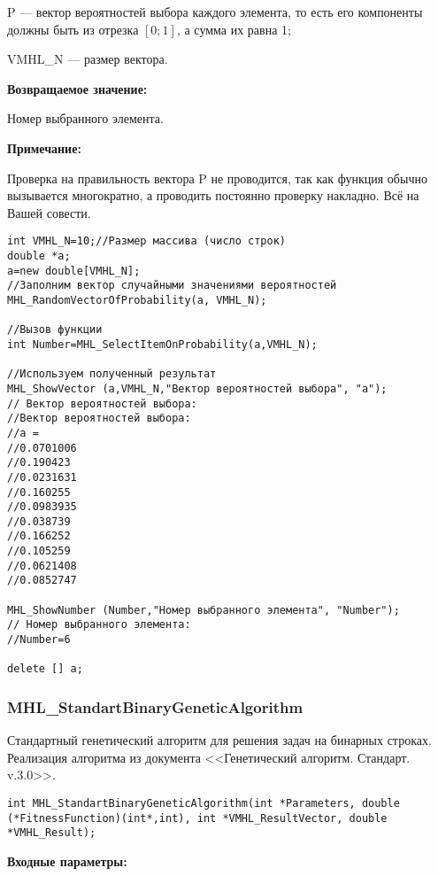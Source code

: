 \documentclass[a4paper,12pt]{article}
\begin{document}
 P --- вектор вероятностей выбора каждого элемента, то есть его компоненты должны быть из отрезка $[0;1]$, а сумма их равна 1;
 
 VMHL\_N --- размер вектора.

\textbf{Возвращаемое значение:} 

Номер выбранного элемента.

\textbf{Примечание:}

 Проверка на правильность вектора P не проводится, так как функция обычно вызывается многократно, а проводить постоянно проверку накладно. Всё на Вашей совести.



\begin{lstlisting}[label=code_use_MHL_SelectItemOnProbability,caption=Пример использования]
int VMHL_N=10;//Размер массива (число строк)
double *a;
a=new double[VMHL_N];
//Заполним вектор случайными значениями вероятностей
MHL_RandomVectorOfProbability(a, VMHL_N);

//Вызов функции
int Number=MHL_SelectItemOnProbability(a,VMHL_N);

//Используем полученный результат
MHL_ShowVector (a,VMHL_N,"Вектор вероятностей выбора", "a");
// Вектор вероятностей выбора:
//Вектор вероятностей выбора:
//a =
//0.0701006
//0.190423
//0.0231631
//0.160255
//0.0983935
//0.038739
//0.166252
//0.105259
//0.0621408
//0.0852747

MHL_ShowNumber (Number,"Номер выбранного элемента", "Number");
// Номер выбранного элемента:
//Number=6

delete [] a;
\end{lstlisting}

\subsubsection{MHL\_StandartBinaryGeneticAlgorithm}\label{MHL_StandartBinaryGeneticAlgorithm}

Стандартный генетический алгоритм для решения задач на бинарных строках. Реализация алгоритма из документа <<Генетический алгоритм. Стандарт. v.3.0>>.


\begin{lstlisting}[label=code_syntax_MHL_StandartBinaryGeneticAlgorithm,caption=Синтаксис]
int MHL_StandartBinaryGeneticAlgorithm(int *Parameters, double (*FitnessFunction)(int*,int), int *VMHL_ResultVector, double *VMHL_Result);
\end{lstlisting}

\textbf{Входные параметры:}
 
\end{document}
